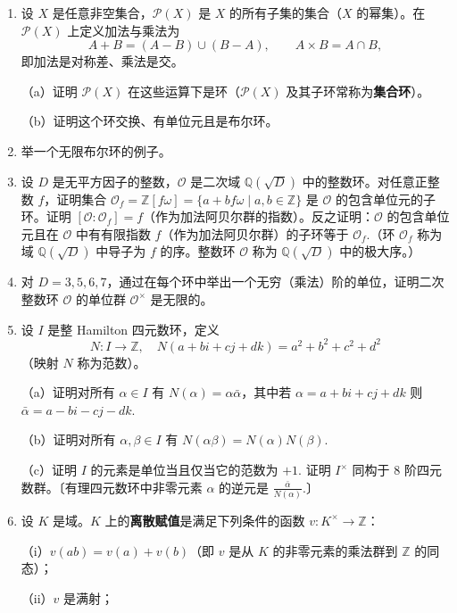 \begin{enumerate}
\item 设 \(X\) 是任意非空集合，\(\mathcal{P}(X)\) 是 \(X\) 的所有子集的集合（\(X\) 的幂集）。在 \(\mathcal{P}(X)\) 上定义加法与乘法为
\[
A + B = (A - B) \cup (B - A), \qquad A \times B = A \cap B,
\]
即加法是对称差、乘法是交。

（a）证明 \(\mathcal{P}(X)\) 在这些运算下是环（\(\mathcal{P}(X)\) 及其子环常称为\textbf{集合环}）。

（b）证明这个环交换、有单位元且是布尔环。

\item 举一个无限布尔环的例子。

\item 设 \(D\) 是无平方因子的整数，\(\mathcal{O}\) 是二次域 \(\mathbb{Q}(\sqrt{D})\) 中的整数环。对任意正整数 \(f\)，证明集合 \(\mathcal{O}_f = \mathbb{Z}[f\omega] = \{a + bf\omega \mid a, b \in \mathbb{Z}\}\) 是 \(\mathcal{O}\) 的包含单位元的子环。证明 \([\mathcal{O} : \mathcal{O}_f] = f\)（作为加法阿贝尔群的指数）。反之证明：\(\mathcal{O}\) 的包含单位元且在 \(\mathcal{O}\) 中有有限指数 \(f\)（作为加法阿贝尔群）的子环等于 \(\mathcal{O}_f\).（环 \(\mathcal{O}_f\) 称为域 \(\mathbb{Q}(\sqrt{D})\) 中导子为 \(f\) 的序。整数环 \(\mathcal{O}\) 称为 \(\mathbb{Q}(\sqrt{D})\) 中的极大序。）

\item 对 \(D = 3, 5, 6, 7\)，通过在每个环中举出一个无穷（乘法）阶的单位，证明二次整数环 \(\mathcal{O}\) 的单位群 \(\mathcal{O}^\times\) 是无限的。

\item 设 \(I\) 是整 Hamilton 四元数环，定义
\[
N : I \to \mathbb{Z}, \quad N(a+bi+cj+dk) = a^2+b^2+c^2+d^2
\]
（映射 \(N\) 称为范数）。

（a）证明对所有 \(\alpha \in I\) 有 \(N(\alpha) = \alpha\bar\alpha\)，其中若 \(\alpha = a+bi+cj+dk\) 则 \(\bar\alpha = a-bi-cj-dk\).

（b）证明对所有 \(\alpha, \beta \in I\) 有 \(N(\alpha\beta) = N(\alpha)N(\beta)\).

（c）证明 \(I\) 的元素是单位当且仅当它的范数为 \(+1\). 证明 \(I^\times\) 同构于 8 阶四元数群。〔有理四元数环中非零元素 \(\alpha\) 的逆元是 \(\frac{\bar\alpha}{N(\alpha)}\).〕

\item 设 \(K\) 是域。\(K\) 上的\textbf{离散赋值}是满足下列条件的函数 \(v : K^\times \to \mathbb{Z}\)：

（i）\(v(ab) = v(a) + v(b)\)（即 \(v\) 是从 \(K\) 的非零元素的乘法群到 \(\mathbb{Z}\) 的同态）；

（ii）\(v\) 是满射；


\end{enumerate}
